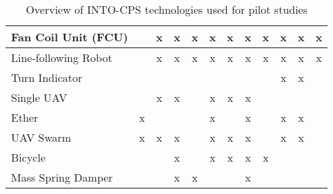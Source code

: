 \begin{table}[ht]
\begin{centering}
\begin{tabular}{|l|c|c|c|c|c|c|c|c|c|c|c|}
Fan Coil Unit (FCU)		& &x&x&x&x&x&x&x&x&x&x\\ \hline
Line-following Robot		& &x&x&x&x&x&x&x&x&x&x\\ \hline
Turn Indicator			& & & & & & & & &x&x&\\ \hline
Single UAV			& &x&x& &x&x&x& & & &\\ \hline
Ether				&x& & & &x& &x& &x&x& \\ \hline
UAV Swarm			&x&x&x& &x&x&x& &x&x&\\ \hline
Bicycle			& & &x& &x&x&x&x& & &\\ \hline
Mass Spring Damper			& & &x&x& & &x& & & &\\ \hline
\end{tabular}
\caption{Overview of INTO-CPS technologies used for pilot studies}
\label{tab:into_examples}
\end{centering}
\end{table}